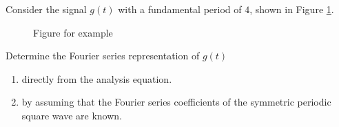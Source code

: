 \begin{frame}
    \begin{example}%
        Consider the signal $g(t)$ with a fundamental period of $4$, shown in Figure \ref{fi:example3p6}.
        \begin{figure}
          \centering
          
          \caption{Figure for example}\label{fi:example3p6}
        \end{figure}

        Determine the Fourier series representation of $g(t)$
        \begin{enumerate}
            \item directly from the analysis equation.
            \item by assuming that the Fourier series coefficients of the symmetric periodic square wave are known.
        \end{enumerate}
    \end{example}
\end{frame}







